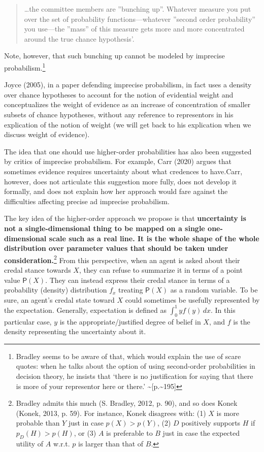 \documentclass[
  10pt,
  dvipsnames,enabledeprecatedfontcommands]{scrartcl}
\begin{document}
\begin{quote}
\dots the committee members are ''bunching up''. Whatever measure you put over the set of probability functions---whatever ''second order probability'' you use---the ''mass'' of this measure gets more and more concentrated around the true chance hypothesis'.
\end{quote}

\noindent Note, however, that such bunching up cannot be modeled by
imprecise probabilism.\footnote{Bradley seems to be aware of that, which
  would explain the use of scare quotes: when he talks about the option
  of using second-order probabilities in decision theory, he insists
  that `there is no justification for saying that there is more of your
  representor here or there.' \textasciitilde{[}p.\textasciitilde195{]}}

Joyce (2005), in a paper defending imprecise probabilism, in fact uses a
density over chance hypotheses to account for the notion of evidential
weight and conceptualizes the weight of evidence as an increase of
concentration of smaller subsets of chance hypotheses, without any
reference to representors in his explication of the notion of weight (we
will get back to his explication when we discuss weight of evidence).

The idea that one should use higher-order probabilities has also been
suggested by critics of imprecise probabilism. For example, Carr (2020)
argues that sometimes evidence requires uncertainty about what credences
to have.Carr, however, does not articulate this suggestion more fully,
does not develop it formally, and does not explain how her approach
would fare against the difficulties affecting precise ad imprecise
probabilism.

The key idea of the higher-order approach we propose is that
\textbf{uncertainty is not a single-dimensional thing to be mapped on a
single one-dimensional scale such as a real line. It is the whole shape
of the whole distribution over parameter values that should be taken
under consideration.}\footnote{Bradley admits this much (S. Bradley,
  2012, p. 90), and so does Konek (Konek, 2013, p. 59). For instance,
  Konek disagrees with: (1) \(X\) is more probable than \(Y\) just in
  case \(p(X)>p(Y)\), (2) \(D\) positively supports \(H\) if
  \(p_D(H)> p(H)\), or (3) \(A\) is preferable to \(B\) just in case the
  expected utility of \(A\) w.r.t. \(p\) is larger than that of \(B\).}
From this perspective, when an agent is asked about their credal stance
towards \(X\), they can refuse to summarize it in terms of a point value
\(\mathsf{P}(X)\). They can instead express their credal stance in terms
of a probability (density) distribution \(f_x\) treating
\(\mathsf{P}(X)\) as a random variable. To be sure, an agent's credal
state toward \(X\) could sometimes be usefully represented by the
expectation. Generally, expectation is defined as
\(\int_{0}^{1} y f(y) \, dx\). In this particular case, \(y\) is the
appropriate/justified degree of belief in \(X\), and \(f\) is the
density representing the uncertainty about it.
\end{document}
